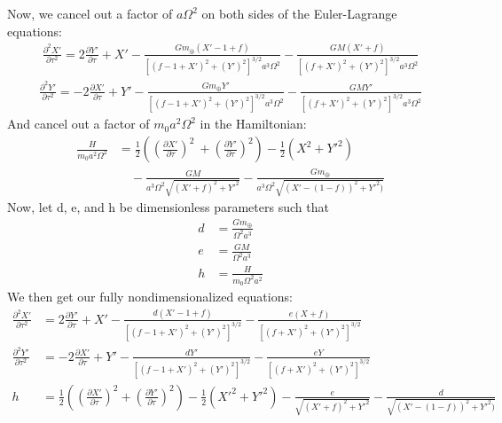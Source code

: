 \documentclass[11pt]{article}
\begin{document}
Now, we cancel out a factor of $a \Omega^2$ on both sides of the Euler-Lagrange equations:
\begin{align}
    \frac{\partial^2 X'}{\partial \tau^2}
    =2 \frac{\partial Y'}{\partial \tau}
    +X' - \frac{Gm_\oplus (X'-1+f)}{[(f-1+X')^2 +(Y') ^2]^{3/2}a^3\Omega^2} -\frac{GM (X'+f)}{[(f+X')^2 +(Y') ^2]^{3/2}a^3\Omega^2}
\end{align}
\begin{align}
    \frac{\partial^2 Y'}{\partial \tau^2}
    =-2 \frac{\partial X'}{\partial \tau}
    +Y' - \frac{Gm_\oplus Y'}{[(f-1+X')^2 +(Y') ^2]^{3/2}a^3\Omega^2} -\frac{GM Y'}{[(f+X')^2 +(Y') ^2]^{3/2}a^3\Omega^2}
\end{align}
And cancel out a factor of $m_0a^2 \Omega^2$ in the Hamiltonian:
\begin{align}
    \frac{H}{m_{0}a^2 \Omega^2} &= \frac{1}{2}\left( \left(\frac{\partial X'}{\partial \tau}\right)^2 \ +  \left(\frac{\partial Y'}{\partial \tau}\right)^2 \right) - \frac{1}{2} (X^2 + Y'^2) \nonumber \\
    & \quad - \frac{GM}{a^3\Omega ^2\sqrt{(X'+f)^2 + Y'^2}} - \frac{Gm_\oplus }{a^3\Omega ^2\sqrt{(X'-(1-f))^2 + Y'^2)}}
\end{align}
Now, let d, e, and h be dimensionless parameters such that
\begin{align}
    d &= \frac{Gm_\oplus}{\Omega^2 a^3} \\
    e &= \frac{GM}{\Omega^2 a^3} \\
    h &= \frac{H}{m_{0}\Omega^2 a^2}
\end{align}
We then get our fully nondimensionalized equations: 
\begin{align}
    \frac{\partial^2 X'}{\partial \tau^2}
    & =2 \frac{\partial Y'}{\partial \tau}
    +X' - \frac{d (X'-1+f)}{[(f-1+X')^2 +(Y') ^2]^{3/2}} -\frac{e (X+f)}{[(f+X')^2 +(Y') ^2]^{3/2}} \\
    \frac{\partial^2 Y'}{\partial \tau^2}
    & =-2 \frac{\partial X'}{\partial \tau}
    +Y' - \frac{d Y'}{[(f-1+X')^2 +(Y') ^2]^{3/2}} -\frac{e Y}{[(f+X')^2 +(Y') ^2]^{3/2}} \\
    h &= \frac{1}{2}\left( \left(\frac{\partial X'}{\partial \tau}\right)^2 +  \left(\frac{\partial Y'}{\partial \tau}\right)^2 \right) - \frac{1}{2} (X'^2 + Y'^2)   - \frac{e}{\sqrt{(X'+f)^2 + Y'^2}} - \frac{d}{\sqrt{(X'-(1-f))^2 + Y'^2)}}
\end{align}

\end{document}
